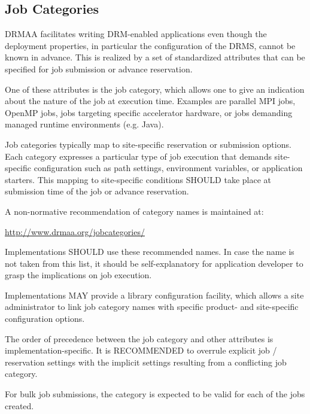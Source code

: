 \documentclass{article}
\newcommand{\rat}[1]{}
\begin{document}
\subsection{Job Categories}
\label{sec:jobcategories}

DRMAA facilitates writing DRM-enabled applications even though the deployment properties, in particular the configuration of the DRMS, cannot be known in advance. This is realized by a set of standardized attributes that can be specified for job submission or advance reservation.

One of these attributes is the job category, which allows one to give an indication about the nature of the job at execution time. Examples are parallel MPI jobs, OpenMP jobs, jobs targeting specific accelerator hardware, or jobs demanding managed runtime environments (e.g. Java).

Job categories typically map to site-specific reservation or submission options. Each category expresses a particular type of job execution that demands site-specific configuration such as path settings, environment variables, or application starters. This mapping to site-specific conditions SHOULD take place at submission time of the job or advance reservation.

A non-normative recommendation of category names is maintained at:

\url{http://www.drmaa.org/jobcategories/}

Implementations SHOULD use these recommended names. In case the name is not taken from this list, it should be self-explanatory for application developer to grasp the implications on job execution.

Implementations MAY provide a library configuration facility, which allows a site administrator to link job category names with specific product- and site-specific configuration options.

The order of precedence between the job category and other attributes is implementation-specific. It is RECOMMENDED to overrule explicit job / reservation settings with the implicit settings resulting from a conflicting job category.

For bulk job submissions, the category is expected to be valid for each of the jobs created.

\rat{There was a discussion on supporting the specification of multiple categories at the same time. Since this would put more burden on the implementation in terms of conflict resolving, we avoided that intentionally. This allows to map categories simply to some additional job submission command line arguments, similar to the old nativeSpecification thing.}
\end{document}
